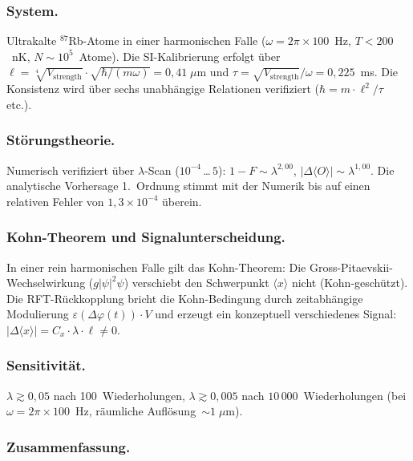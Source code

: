 \documentclass[12pt]{iopart}
\begin{document}
	\subsubsection{System.}
	
	Ultrakalte ${}^{87}$Rb-Atome in einer harmonischen Falle
	($\omega = 2\pi \times 100$~Hz, $T < 200$~nK,
	$N \sim 10^5$~Atome). Die SI-Kalibrierung erfolgt \"uber
	$\ell = \sqrt[4]{V_{\mathrm{strength}}} \cdot
	\sqrt{\hbar/(m\omega)} = 0{,}41\;\mu$m und
	$\tau = \sqrt{V_{\mathrm{strength}}} / \omega
	= 0{,}225$~ms.
	Die Konsistenz wird \"uber sechs unabh\"angige
	Relationen verifiziert
	($\hbar = m \cdot \ell^2 / \tau$ etc.).
	
	\subsubsection{St\"orungstheorie.}
	
	Numerisch verifiziert \"uber $\lambda$-Scan
	($10^{-4}$\,\ldots\,$5$):
	$1 - F \sim \lambda^{2{,}00}$,
	$|\Delta\langle O\rangle| \sim \lambda^{1{,}00}$.
	Die analytische Vorhersage 1.\ Ordnung stimmt mit der
	Numerik bis auf einen relativen Fehler von
	$1{,}3 \times 10^{-4}$ \"uberein.
	
	\subsubsection{Kohn-Theorem und Signalunterscheidung.}
	
	In einer rein harmonischen Falle gilt das Kohn-Theorem:
	Die Gross-Pitaevskii-Wechselwirkung ($g|\psi|^2\psi$)
	verschiebt den Schwerpunkt $\langle x\rangle$ nicht
	(Kohn-gesch\"utzt). Die RFT-R\"uckkopplung bricht die
	Kohn-Bedingung durch zeitabh\"angige Modulierung
	$\varepsilon(\Delta\varphi(t)) \cdot V$ und erzeugt
	ein konzeptuell verschiedenes Signal:
	$|\Delta\langle x\rangle| = C_x \cdot \lambda \cdot
	\ell \neq 0$.
	
	\subsubsection{Sensitivit\"at.}
	
	$\lambda \gtrsim 0{,}05$ nach 100~Wiederholungen,
	$\lambda \gtrsim 0{,}005$ nach $10\,000$~Wiederholungen
	(bei $\omega = 2\pi \times 100$~Hz, r\"aumliche
	Aufl\"osung~${\sim}1\;\mu$m).
	
	\subsubsection{Zusammenfassung.}
	
\end{document}
